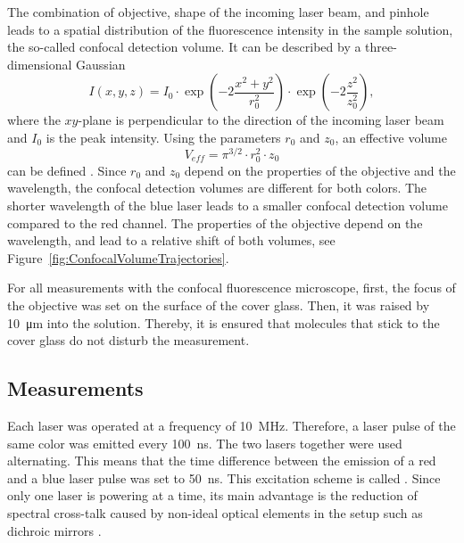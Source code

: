 The combination of objective, shape of the incoming laser beam, and pinhole leads to a spatial distribution of the fluorescence intensity in the sample solution, the so-called confocal detection volume. It can be described by a three-dimensional Gaussian
\begin{equation} \label{Equation:3DGaussian}
	I(x, y, z) = I_0 \cdot \exp\left( -2 \frac{x^2+y^2}{r_0^2}\right) \cdot \exp\left(-2 \frac{z^2}{z_0^2}\right),
\end{equation}
where the $xy$-plane is perpendicular to the direction of the incoming laser beam and $I_0$ is the peak intensity. Using the parameters $r_0$ and $z_0$, an effective volume 
\begin{equation} \label{Equation:DefinitionConfocalVolume}
	V_{eff} = \pi^{3/2} \cdot r_0^2 \cdot z_0
\end{equation}
can be defined \cite{Schwille2001}. Since $r_0$ and $z_0$ depend on the properties of the objective and the wavelength, the confocal detection volumes are different for both colors. The shorter wavelength of the blue laser leads to a smaller confocal detection volume compared to the red channel. The properties of the objective depend on the wavelength, and lead to a relative shift of both volumes, see Figure~\ref{fig:ConfocalVolumeTrajectories}. 

For all measurements with the confocal fluorescence microscope, first, the focus of the objective was set on the surface of the cover glass. Then, it was raised by \SI{10}{\micro\meter} into the solution. Thereby, it is ensured that molecules that stick to the cover glass do not disturb the measurement.

\subsection{Measurements} \label{Section:Measurements}

Each laser was operated at a frequency of \SI{10}{\mega\hertz}. Therefore, a laser pulse of the same color was emitted every \SI{100}{\nano\second}. The two lasers together were used alternating. This means that the time difference between the emission of a red and a blue laser pulse was set to \SI{50}{\nano\second}. This excitation scheme is called . Since only one laser is powering at a time, its main advantage is the reduction of spectral cross-talk caused by non-ideal optical elements in the setup such as dichroic mirrors \cite{Mueller2005}.\\

